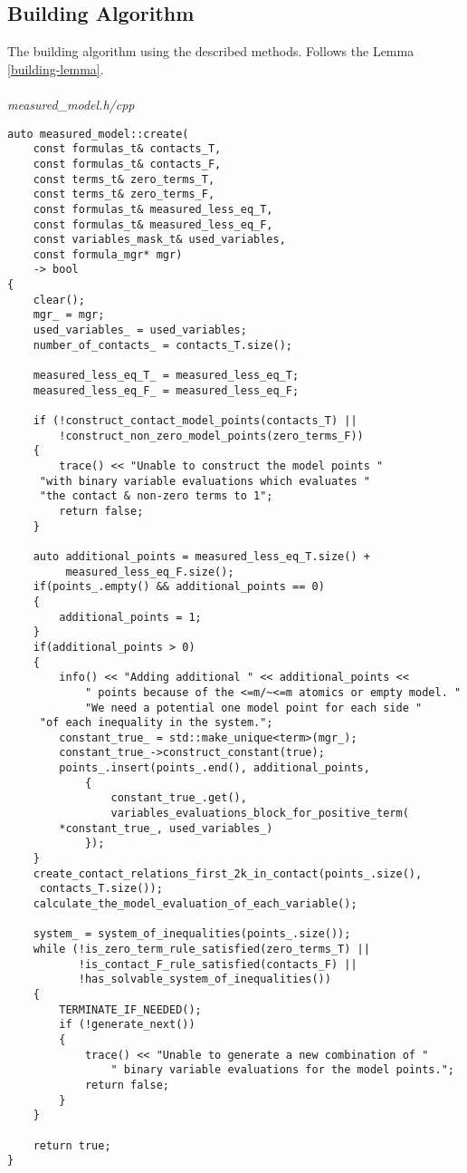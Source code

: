 \documentclass{article}
\begin{document}
	\subsection{Building Algorithm}
		The building algorithm using the described methods. Follows the Lemma \ref{building-lemma}.
\\
\\
\noindent
\textit{measured\_model.h/cpp}
\begin{lstlisting}
auto measured_model::create(
    const formulas_t& contacts_T,
    const formulas_t& contacts_F,
    const terms_t& zero_terms_T,
    const terms_t& zero_terms_F,
    const formulas_t& measured_less_eq_T,
    const formulas_t& measured_less_eq_F,
    const variables_mask_t& used_variables,
    const formula_mgr* mgr)
    -> bool
{
    clear();
    mgr_ = mgr;
    used_variables_ = used_variables;
    number_of_contacts_ = contacts_T.size();

    measured_less_eq_T_ = measured_less_eq_T;
    measured_less_eq_F_ = measured_less_eq_F;

    if (!construct_contact_model_points(contacts_T) ||
        !construct_non_zero_model_points(zero_terms_F))
    {
        trace() << "Unable to construct the model points "
	 "with binary variable evaluations which evaluates "
	 "the contact & non-zero terms to 1";
        return false;
    }

    auto additional_points = measured_less_eq_T.size() +
		 measured_less_eq_F.size();
    if(points_.empty() && additional_points == 0)
    {
        additional_points = 1;
    }
    if(additional_points > 0)
    {
        info() << "Adding additional " << additional_points <<
            " points because of the <=m/~<=m atomics or empty model. "
            "We need a potential one model point for each side "
	 "of each inequality in the system.";
        constant_true_ = std::make_unique<term>(mgr_);
        constant_true_->construct_constant(true);
        points_.insert(points_.end(), additional_points, 
            {
                constant_true_.get(),
                variables_evaluations_block_for_positive_term(
		*constant_true_, used_variables_)
            });
    }
    create_contact_relations_first_2k_in_contact(points_.size(),
	 contacts_T.size());
    calculate_the_model_evaluation_of_each_variable();

    system_ = system_of_inequalities(points_.size());
    while (!is_zero_term_rule_satisfied(zero_terms_T) ||
           !is_contact_F_rule_satisfied(contacts_F) ||
           !has_solvable_system_of_inequalities())
    {
        TERMINATE_IF_NEEDED();
        if (!generate_next())
        {
            trace() << "Unable to generate a new combination of " 
                " binary variable evaluations for the model points.";
            return false;
        }
    }

    return true;
}
\end{lstlisting}
\end{document}
